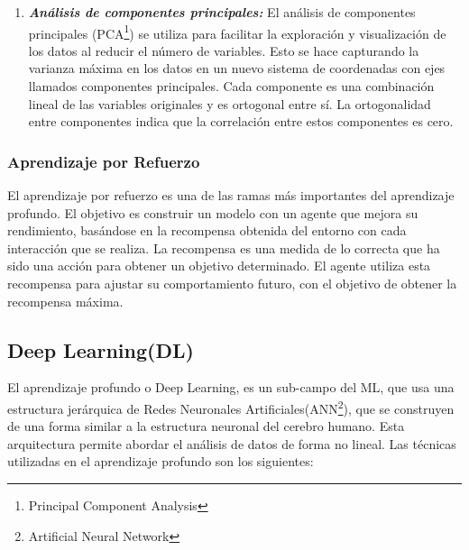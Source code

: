 \begin{enumerate}[label=\textbf{\arabic*})]
	\begin{enumerate}[label=\textbf{(\alph*)}]
		\item \textit{\textbf{Análisis de componentes principales:}}
		El análisis de componentes principales (PCA\footnote{Principal Component Analysis}) se utiliza para facilitar la exploración y visualización de los datos al reducir el número de variables. Esto se hace capturando la varianza máxima en los datos en un nuevo sistema de coordenadas con ejes llamados componentes principales. Cada componente es una combinación lineal de las variables originales y es ortogonal entre sí. La ortogonalidad entre componentes indica que la correlación entre estos componentes es cero\cite{Shaw2019}.
	\end{enumerate}
	
\end{enumerate}

\subsubsection{Aprendizaje por Refuerzo}

El aprendizaje por refuerzo es una de las ramas más importantes del aprendizaje profundo. El objetivo es construir un modelo con un agente que mejora su rendimiento, basándose en la recompensa obtenida del entorno con cada interacción que se realiza. La recompensa es una medida de lo correcta que ha sido una acción para obtener un objetivo determinado. El agente utiliza esta recompensa para ajustar su comportamiento futuro, con el objetivo de obtener la recompensa máxima\cite{BriegaLopez2015}. 

\newpage
\subsection{Deep Learning(DL)}

El aprendizaje profundo o Deep Learning, es un sub-campo del ML, que usa una estructura jerárquica de Redes Neuronales Artificiales(ANN\footnote{Artificial Neural Network}), que se construyen de una forma similar a la estructura neuronal del cerebro humano. Esta arquitectura permite abordar el análisis de datos de forma no lineal\cite{BriegaLopez2015}.  Las técnicas utilizadas en el aprendizaje profundo son los siguientes:

